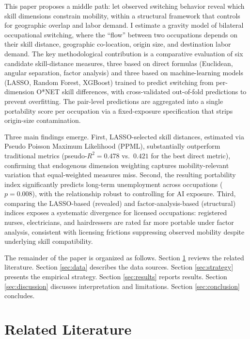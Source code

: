 \documentclass[12pt]{article}
\begin{document}
This paper proposes a middle path: let observed switching behavior reveal which skill dimensions constrain mobility, within a structural framework that controls for geographic overlap and labor demand. I estimate a gravity model of bilateral occupational switching, where the ``flow'' between two occupations depends on their skill distance, geographic co-location, origin size, and destination labor demand. The key methodological contribution is a comparative evaluation of six candidate skill-distance measures, three based on direct formulas (Euclidean, angular separation, factor analysis) and three based on machine-learning models (LASSO, Random Forest, XGBoost) trained to predict switching from per-dimension O*NET skill differences, with cross-validated out-of-fold predictions to prevent overfitting. The pair-level predictions are aggregated into a single portability score per occupation via a fixed-exposure specification that strips origin-size contamination.

Three main findings emerge. First, LASSO-selected skill distances, estimated via Pseudo Poisson Maximum Likelihood (PPML), substantially outperform traditional metrics (pseudo-$R^2 = 0.478$ vs.\ $0.421$ for the best direct metric), confirming that endogenous dimension weighting captures mobility-relevant variation that equal-weighted measures miss. Second, the resulting portability index significantly predicts long-term unemployment across occupations ($p = 0.008$), with the relationship robust to controlling for AI exposure. Third, comparing the LASSO-based (revealed) and factor-analysis-based (structural) indices exposes a systematic divergence for licensed occupations: registered nurses, electricians, and hairdressers are rated far more portable under factor analysis, consistent with licensing frictions suppressing observed mobility despite underlying skill compatibility.

The remainder of the paper is organized as follows. Section \ref{sec:literature} reviews the related literature. Section \ref{sec:data} describes the data sources. Section \ref{sec:strategy} presents the empirical strategy. Section \ref{sec:results} reports results. Section \ref{sec:discussion} discusses interpretation and limitations. Section \ref{sec:conclusion} concludes.

\section{Related Literature}
\label{sec:literature}
\end{document}
